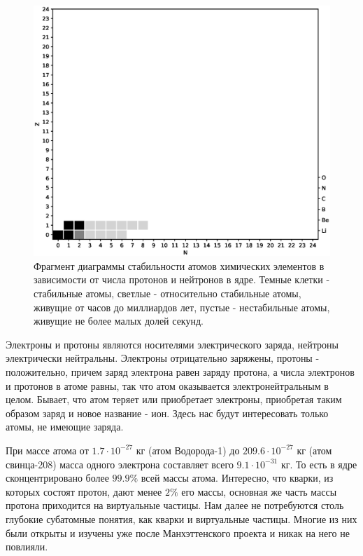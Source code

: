 \begin{figure}[t!]
   \centering
   \includegraphics[scale=0.4]{images/atom_stability}
   \caption{Фрагмент диаграммы стабильности атомов химических элементов в зависимости от числа протонов и нейтронов в ядре. Темные клетки - стабильные атомы, светлые - относительно стабильные атомы, живущие от часов до миллиардов лет, пустые - нестабильные атомы, живущие не более малых долей секунд.}
   \label{fig:atom_stability}
\end{figure}




Электроны и протоны являются носителями электрического заряда, нейтроны электрически нейтральны. 
Электроны отрицательно заряжены, протоны - положительно, причем заряд электрона равен заряду протона, а числа электронов и протонов в атоме равны, так что атом оказывается электронейтральным в целом.
Бывает, что атом теряет или приобретает электроны, приобретая таким образом заряд и новое название - ион.
Здесь нас будут интересовать только атомы, не имеющие заряда.

При массе атома от $1.7\cdot 10^{-27}$ кг (атом Водорода-1) до $209.6\cdot 10^{-27}$ кг (атом свинца-208) масса одного электрона составляет всего $9.1\cdot 10^{-31}$ кг.
То есть в ядре сконцентрировано более $99.9\%$ всей массы атома.
Интересно, что кварки, из которых состоят протон, дают менее $2\%$ его массы, основная же часть массы протона приходится на виртуальные частицы.
Нам далее не потребуются столь глубокие субатомные понятия, как кварки и виртуальные частицы. 
Многие из них были открыты и изучены уже после Манхэттенского проекта и никак на него не повлияли. 


